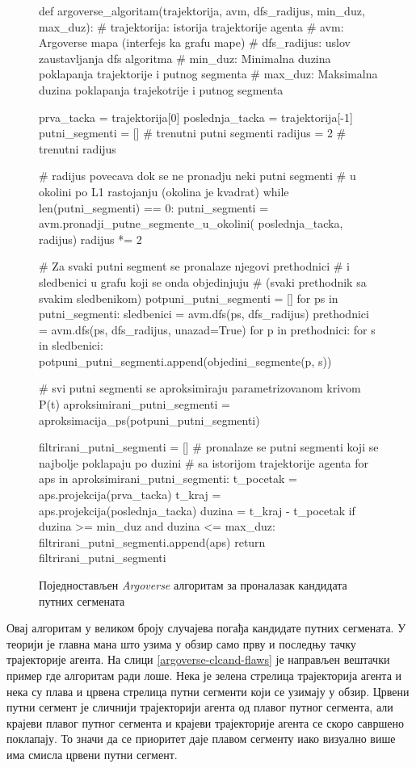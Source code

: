 \documentclass[11pt,oneside]{memoir}
\begin{document}
\begin{figure}
\begin{python}
def argoverse_algoritam(trajektorija, avm, dfs_radijus, min_duz, max_duz):
  # trajektorija: istorija trajektorije agenta 
  # avm: Argoverse mapa (interfejs ka grafu mape)
  # dfs_radijus: uslov zaustavljanja dfs algoritma
  # min_duz: Minimalna duzina poklapanja trajektorije i putnog segmenta
  # max_duz: Maksimalna duzina poklapanja trajekotrije i putnog segmenta

  prva_tacka = trajektorija[0]
  poslednja_tacka = trajektorija[-1]
  putni_segmenti = []  # trenutni putni segmenti
  radijus = 2  # trenutni radijus

  # radijus povecava dok se ne pronadju neki putni segmenti 
  # u okolini po L1 rastojanju (okolina je kvadrat)
  while len(putni_segmenti) == 0:
    putni_segmenti = avm.pronadji_putne_segmente_u_okolini(
      poslednja_tacka, radijus)
    radijus *= 2

  # Za svaki putni segment se pronalaze njegovi prethodnici
  # i sledbenici u grafu koji se onda objedinjuju 
  # (svaki prethodnik sa svakim sledbenikom)
  potpuni_putni_segmenti = []
  for ps in putni_segmenti:
    sledbenici = avm.dfs(ps, dfs_radijus)
    prethodnici = avm.dfs(ps, dfs_radijus, unazad=True)
    for p in prethodnici:
      for s in sledbenici:
        potpuni_putni_segmenti.append(objedini_segmente(p, s))

  # svi putni segmenti se aproksimiraju parametrizovanom krivom P(t)
  aproksimirani_putni_segmenti = aproksimacija_ps(potpuni_putni_segmenti)

  filtrirani_putni_segmenti = []
  # pronalaze se putni segmenti koji se najbolje poklapaju po duzini
  # sa istorijom trajektorije agenta
  for aps in aproksimirani_putni_segmenti:
    t_pocetak = aps.projekcija(prva_tacka)
    t_kraj = aps.projekcija(poslednja_tacka)
    duzina = t_kraj - t_pocetak
    if duzina >= min_duz and duzina <= max_duz:
      filtrirani_putni_segmenti.append(aps)
  return filtrirani_putni_segmenti
\end{python}
\caption{Поједностављен \textit{Argoverse} алгоритам за проналазак кандидата путних сегмената\label{argoverse-clcand}}
\end{figure}

Овај алгоритам у великом броју случајева погађа кандидате путних сегмената. У теорији је главна мана што узима у обзир само прву и последњу
тачку трајекторије агента. На слици \ref{argoverse-clcand-flaws} је направљен вештачки пример где алгоритам ради лоше. Нека је зелена стрелица
трајекторија агента и нека су плава и црвена стрелица путни сегменти који се узимају у обзир. Црвени путни сегмент је сличнији
трајекторији агента од плавог путног сегмента, али крајеви плавог путног сегмента и крајеви трајекторије агента се скоро савршено поклапају. 
То значи да се приоритет даје плавом сегменту иако визуално више има смисла црвени путни сегмент.
\end{document}

